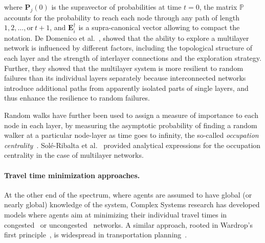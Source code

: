 where $\mathbf{P}_j(0)$ is the supravector of probabilities at time $t=0$, the matrix $\mathbb{P}$ accounts for the probability to reach each node through any path of length $1, 2, \dots, \text{or}\ t+1$, and $\mathbf{E}_i^{\dagger}$ is a supra-canonical vector allowing to compact the notation. De Domenico et al.~\cite{dedomenico2014interconnected}, showed that the ability to explore a multilayer network is influenced by different factors, including the topological structure of each layer and the strength of interlayer connections and the exploration strategy. Further, they showed that the multilayer system is more resilient to random failures than its individual layers separately because interconnected networks introduce additional paths from apparently isolated parts of single layers, and thus enhance the resilience to random failures.

Random walks have further been used to assign a measure of importance to each node in each layer, by measuring the asymptotic probability of finding a random walker at a particular node-layer as time goes to infinity, the so-called \emph{occupation centrality}~\cite{sole2016random}. Sol\'{e}-Ribalta et al.~\cite{sole2016random} provided analytical expressions for the occupation centrality in the case of multilayer networks.

\paragraph{Travel time minimization approaches.}
At the other end of the spectrum, where agents are assumed to have global (or nearly global) knowledge of the system, Complex Systems research has developed models where agents aim at minimizing their individual travel times in congested~\cite{tan2014congestion,bassolas2020scaling,manfredi2018congestion,sole-ribalta2016congestion} or uncongested~\cite{du2014traffic,du2016physics} networks. A similar approach, rooted in Wardrop's first principle~\cite{wardrop1952road}, is widespread in transportation planning~\cite{mcnally2000four}.

